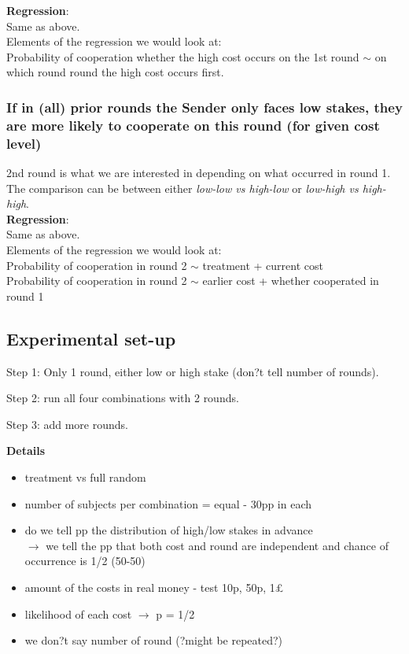 \documentclass[11pt]{article}
\theoremstyle{plainCl1}
\begin{document}
\noindent
\textbf{Regression}:\\
Same as above.\\

\noindent
Elements of the regression we would look at: \\
Probability of cooperation whether the high cost occurs on the 1st round $\sim$ on which round round the high cost occurs first.


\subsubsection{If in (all) prior rounds the Sender only faces low stakes, they are more likely to cooperate on this round (for given cost level)} 
2nd round is what we are interested in depending on what occurred in round 1.
The comparison can be between either \textsl{low-low vs high-low} or \textsl{low-high vs high-high}. \\

\noindent
\textbf{Regression}:\\
Same as above.\\

\noindent
Elements of the regression we would look at: \\
Probability of cooperation in round 2 $\sim$ treatment + current cost \\
Probability of cooperation in round 2 $\sim$ earlier cost + whether cooperated in round 1 \\

\subsection{Experimental set-up}

\begin{description}
	\item Step 1: Only 1 round, either low or high stake (don?t tell number of rounds).
	\item Step 2: run all four combinations with 2 rounds.
	\item Step 3: add more rounds.
\end{description}

\noindent
\textbf{Details}
\begin{itemize}
	\item treatment vs full random
	\item number of subjects per combination = equal - 30pp in each
	\item do we tell pp the distribution of high/low stakes in advance \\ 
	$\rightarrow$ we tell the pp that both cost and round are independent and chance of occurrence is 1/2 (50-50)
	\item amount of the costs in real money - test 10p, 50p, 1\pounds
	\item likelihood of each cost $\rightarrow$ p = 1/2
	\item we don?t say number of round (?might be repeated?)
\end{itemize}
\end{document}
